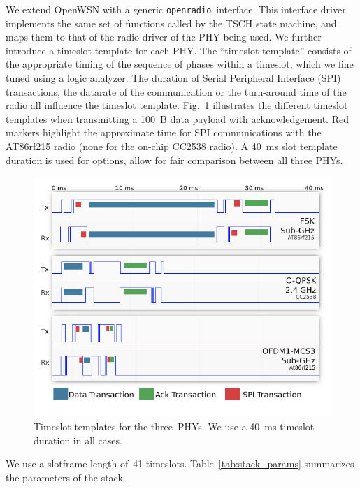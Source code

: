 \documentclass[sensors,article,submit,moreauthors,pdftex]{Definitions/mdpi}
\newcommand{\openradio}     {\texttt{openradio}}
\newcommand{\figwidth}      {0.78}
\begin{document}

We extend OpenWSN with a generic \openradio\ interface.
This interface driver implements the same set of functions called by the TSCH state machine, and maps them to that of the radio driver of the PHY being used.
We further introduce a timeslot template for each PHY.
The ``timeslot template'' consists of the appropriate timing of the sequence of phases within a timeslot, which we fine tuned using a logic analyzer.
The duration of Serial Peripheral Interface (SPI) transactions, the datarate of the communication or the turn-around time of the radio all influence the timeslot template.
Fig.~\ref{fig:timeslot_templates} illustrates the different timeslot templates when transmitting a 100~B data payload with acknowledgement.
Red markers highlight the approximate time for SPI communications with the AT86rf215 radio (none for the on-chip CC2538 radio).
A 40~ms slot template duration is used for options, allow for fair comparison between all three PHYs.

\begin{figure}
	\centering
	\includegraphics[width=\figwidth\columnwidth]{timeslot_templates}
	\caption{
	    Timeslot templates for the three~PHYs.
	    We use a 40~ms timeslot duration in all cases.
	}
    \label{fig:timeslot_templates}
\end{figure}


We use a slotframe length of~41 timeslots.
Table~\ref{tab:stack_params} summarizes the parameters of the stack.
\end{document}
